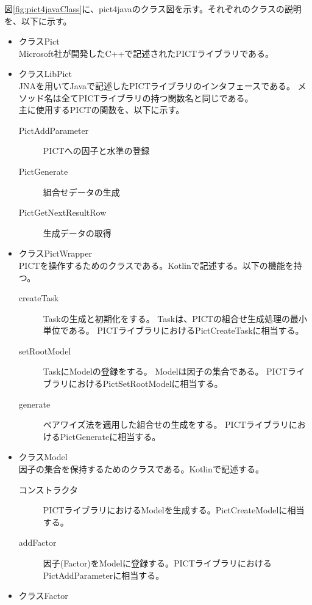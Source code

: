 \documentclass[uplatex, report, a4j, 10pt]{jsbook}
\begin{document}
図\ref{fig:pict4javaClass}に、pict4javaのクラス図を示す。それぞれのクラスの説明を、以下に示す。
\begin{itemize}
  \item クラスPict\\
        Microsoft社が開発したC++で記述されたPICTライブラリである。
  \item クラスLibPict\\
        JNAを用いてJavaで記述したPICTライブラリのインタフェースである。
        メソッド名は全てPICTライブラリの持つ関数名と同じである。\\
        主に使用するPICTの関数を、以下に示す。
        \begin{description}
          \item[PictAddParameter] PICTへの因子と水準の登録
          \item[PictGenerate] 組合せデータの生成
          \item[PictGetNextResultRow] 生成データの取得
        \end{description}
  \item クラスPictWrapper\\
        PICTを操作するためのクラスである。Kotlinで記述する。以下の機能を持つ。
        \begin{description}
          \item[createTask] Taskの生成と初期化をする。
                Taskは、PICTの組合せ生成処理の最小単位である。
                PICTライブラリにおけるPictCreateTaskに相当する。
          \item[setRootModel] TaskにModelの登録をする。
                Modelは因子の集合である。
                PICTライブラリにおけるPictSetRootModelに相当する。
          \item[generate] ペアワイズ法を適用した組合せの生成をする。
                PICTライブラリにおけるPictGenerateに相当する。
        \end{description}
  \item クラスModel\\
        因子の集合を保持するためのクラスである。Kotlinで記述する。
        \begin{description}
          \item[コンストラクタ] PICTライブラリにおけるModelを生成する。PictCreateModelに相当する。
          \item[addFactor] 因子(Factor)をModelに登録する。PICTライブラリにおけるPictAddParameterに相当する。
        \end{description}
  \item クラスFactor

\end{itemize}
\end{document}
